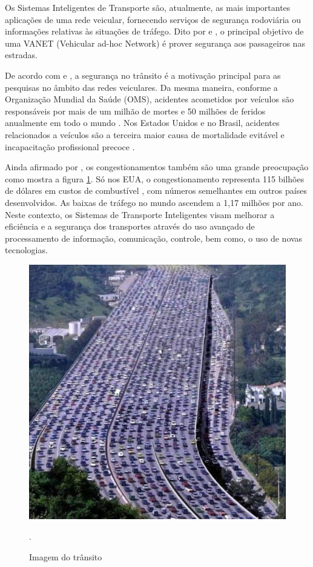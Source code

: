\documentclass[
	12pt,				%
	oneside,			%
	a4paper,			%
	english,			%
	brazil				%
	]{abntex2ppgsi}
\begin{document}
Os Sistemas Inteligentes de Transporte são, atualmente,  as  mais  importantes  aplicações  de  uma  rede  veicular,  fornecendo  serviços  de segurança  rodoviária \cite{xu2003design}  ou  informações  relativas  às  situações  de  tráfego.  Dito por   e , o principal objetivo de uma  VANET (Vehicular ad-hoc Network) é prover segurança aos passageiros nas estradas.

De acordo com  e , a segurança no trânsito é a motivação principal para as pesquisas no âmbito das redes veiculares.  Da mesma maneira, conforme a Organização Mundial da Saúde (OMS), acidentes acometidos por veículos são responsáveis por mais de um milhão de mortes e 50 milhões de feridos anualmente em todo o mundo \cite{peden2004world}. Nos Estados Unidos e no Brasil, acidentes relacionados a veículos são  a terceira maior causa de mortalidade evitável e incapacitação profissional precoce \cite{systematics2011crashes} \cite{el2007systematic}. 

Ainda afirmado por  , os congestionamentos também são uma grande preocupação como mostra a figura \ref{fig:transito}.  Só nos EUA, o congestionamento representa 115 bilhões de dólares em custos de combustível \cite{TTI}, com números semelhantes em outros países desenvolvidos. As baixas de tráfego no mundo ascendem a 1,17 milhões por ano. Neste contexto, os Sistemas de Transporte Inteligentes visam melhorar a eficiência e a segurança dos transportes através do uso avançado de processamento de informação, comunicação, controle, bem como, o uso de novas tecnologias.

\begin{figure}[h!]
	\centering
	\includegraphics[width=0.7\columnwidth]{images/transito2.jpeg}
	\caption{Imagem do trânsito \cite{autoentusiastasclassic}}.
	\label{fig:transito}
\end{figure}
\end{document}
